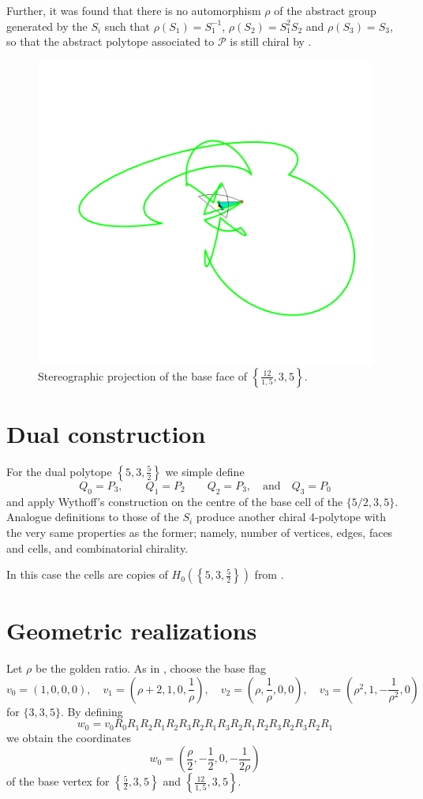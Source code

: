 \documentclass[spanish]{article}
\theoremstyle{definition}
\newcommand{\p}{\mathcal{P}}
\begin{document}
	Further, it was found that there is no automorphism $\rho$ of the abstract group generated by the $S_i$ such that $\rho(S_1)=S_1^{-1}$, $\rho(S_2)=S_1^2S_2$ and $\rho(S_3)=S_3$, so that the abstract polytope associated to $\p$ is still chiral by \cite{schulte-chiral}.
	\begin{figure}
		\centering
		\includegraphics[width=\linewidth]{img2}
		\caption{Stereographic projection of the base face of $\left\{\frac{12}{1,5},3,5\right\}$.}
	\end{figure}
	
	
		\section{Dual construction}
	For the dual polytope $\left\{5,3,\frac{5}{2}\right\}$ we simple define
	\[Q_0=P_3,\qquad Q_1=P_2\qquad Q_2=P_3,\quad\text{and}\quad Q_3=P_0\]
	and apply Wythoff's construction on the centre of the base cell of the $\{5/2,3,5\}$. Analogue definitions to those of the $S_i$ produce another chiral 4-polytope with the very same properties as the former; namely, number of vertices, edges, faces and cells, and combinatorial chirality.
	
	In this case the cells are copies of $H_0(\left\{5,3,\frac{5}{2}\right\})$ from \cite{petcox}.
	
	\section{Geometric realizations}\label{sec:figs}
	Let $\rho$ be the golden ratio. As in \cite{petcox}, choose the base flag 
	\[v_0=(1, 0, 0, 0),\quad v_1=\left(\rho+2,1,0,\frac{1}{\rho }\right), \quad v_2=\left(\rho,\frac{1}{\rho },0,0\right),\quad v_3=\left(\rho ^2,1,-\frac{1}{\rho ^2},0\right)\]
	for $\{3,3,5\}$. By defining
	\[w_0=v_0R_0R_1R_2R_1R_2R_3R_2R_1R_3R_2R_1R_2R_3R_2R_3R_2R_1\]
	we obtain the coordinates
	\[ w_0=\left(\frac{\rho }{2}, -\frac{1}{2}, 0, -\frac{1}{2 \rho }\right)\]
	of the base vertex for $\left\{\frac{5}{2},3,5\right\}$ and $\left\{\frac{12}{1,5},3,5\right\}$.
		
\end{document}
